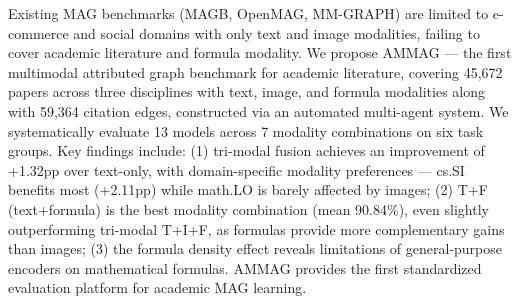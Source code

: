 
\begin{abstract}

现有MAG基准数据集（MAGB、OpenMAG、MM-GRAPH）均限于电商和社交领域且仅含文本与图像双模态，未覆盖学术论文领域和公式模态。针对这一空白，本文提出AMMAG——首个面向学术论文领域的多模态属性图Benchmark数据集，覆盖计算机科学、数学和物理学三个学科共45,672篇论文，包含文本、图像、公式三种模态和59,364条引用边，并通过基于多智能体的自动化系统实现端到端构建。在Benchmark实验方面，本文在六组任务上系统评估了13种模型与7种模态组合。核心发现包括：（1）三模态融合较文本单模态提升+1.32pp，但不同领域模态偏好差异显著——cs.SI获益最大（+2.11pp）而math.LO几乎不受图像影响；（2）T+F（文本+公式）是最佳模态组合（均值90.84\%），甚至略优于三模态T+I+F，公式比图像提供了更多互补增益；（3）公式密度效应揭示了通用编码器在数学公式上的局限，不同领域的模态偏好与模态分布特征直接相关。AMMAG为学术MAG学习研究提供了首个标准化评估平台。

\end{abstract}

\begin{abstractEn}

Existing MAG benchmarks (MAGB, OpenMAG, MM-GRAPH) are limited to e-commerce and social domains with only text and image modalities, failing to cover academic literature and formula modality. We propose AMMAG --- the first multimodal attributed graph benchmark for academic literature, covering 45,672 papers across three disciplines with text, image, and formula modalities along with 59,364 citation edges, constructed via an automated multi-agent system. We systematically evaluate 13 models across 7 modality combinations on six task groups. Key findings include: (1) tri-modal fusion achieves an improvement of +1.32pp over text-only, with domain-specific modality preferences --- cs.SI benefits most (+2.11pp) while math.LO is barely affected by images; (2) T+F (text+formula) is the best modality combination (mean 90.84\%), even slightly outperforming tri-modal T+I+F, as formulas provide more complementary gains than images; (3) the formula density effect reveals limitations of general-purpose encoders on mathematical formulas. AMMAG provides the first standardized evaluation platform for academic MAG learning.
\end{abstractEn}
